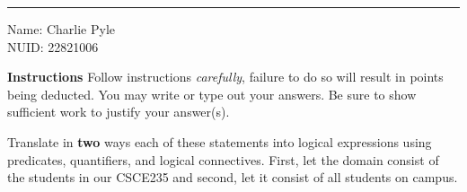 \documentclass[10pt]{exam}
\begin{document}
\hrule

\vspace{.50cm} Name: Charlie Pyle 
\\ NUID: 22821006
\vspace{.50cm}

\textbf{Instructions} Follow instructions \emph{carefully}, failure to do so will result in points being deducted. You may write or type out your answers. Be sure to show sufficient work to justify your answer(s).

\begin{questions}

\question[12] Translate in \textbf{two} ways each of these statements into logical
expressions using predicates, quantifiers, and logical
connectives. First, let the domain consist of the students in our CSCE235 and second, let it consist of all students on campus.


\end{questions}
\end{document}
